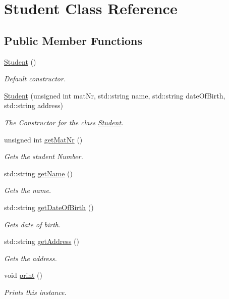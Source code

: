 \hypertarget{class_student}{}\section{Student Class Reference}
\label{class_student}
\subsection*{Public Member Functions}
\begin{DoxyCompactItemize}
\item 
\mbox{\label{class_student_af9168cedbfa5565cf0b20c1a9d3f5c9d}} 
\hyperlink{class_student_af9168cedbfa5565cf0b20c1a9d3f5c9d}{Student} ()
\begin{DoxyCompactList}\small\item\em Default constructor. \end{DoxyCompactList}\item 
\hyperlink{class_student_a6c25e4c1ba2564591573597a6c9ecca0}{Student} (unsigned int mat\+Nr, std\+::string name, std\+::string date\+Of\+Birth, std\+::string address)
\begin{DoxyCompactList}\small\item\em The Constructor for the class \hyperlink{class_student}{Student}. \end{DoxyCompactList}\item 
unsigned int \hyperlink{class_student_a2f996798d6c9b904e3abf902f68d3c0b}{get\+Mat\+Nr} ()
\begin{DoxyCompactList}\small\item\em Gets the student Number. \end{DoxyCompactList}\item 
std\+::string \hyperlink{class_student_a729c900a0e95c46f90668f527a72ad34}{get\+Name} ()
\begin{DoxyCompactList}\small\item\em Gets the name. \end{DoxyCompactList}\item 
std\+::string \hyperlink{class_student_a9c46502480d94c46865eee494f96bfe0}{get\+Date\+Of\+Birth} ()
\begin{DoxyCompactList}\small\item\em Gets date of birth. \end{DoxyCompactList}\item 
std\+::string \hyperlink{class_student_a960945bd258db14e42973ad04150ebf5}{get\+Address} ()
\begin{DoxyCompactList}\small\item\em Gets the address. \end{DoxyCompactList}\item 
\mbox{\label{class_student_a78e0a36e97d117f12bd1879ca7e5cf9c}} 
void \hyperlink{class_student_a78e0a36e97d117f12bd1879ca7e5cf9c}{print} ()
\begin{DoxyCompactList}\small\item\em Prints this instance. \end{DoxyCompactList}\end{DoxyCompactItemize}


